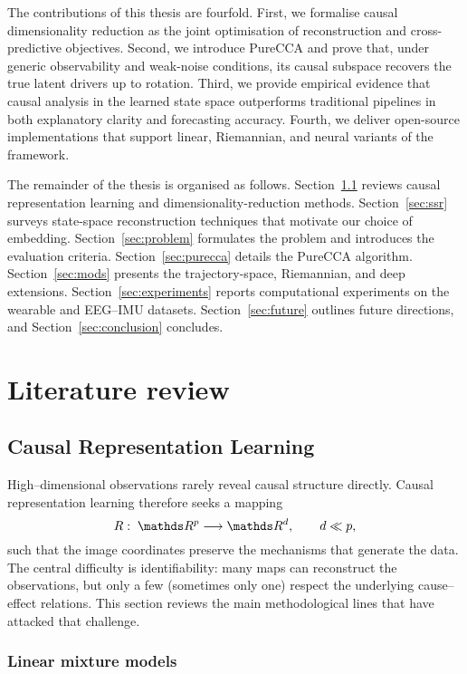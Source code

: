 \documentclass[14pt]{extarticle}
\begin{document}
	The contributions of this thesis are fourfold.  
	First, we formalise causal dimensionality reduction as the joint optimisation of reconstruction and cross-predictive objectives.  
	Second, we introduce PureCCA and prove that, under generic observability and weak-noise conditions, its causal subspace recovers the true latent drivers up to rotation.  
	Third, we provide empirical evidence that causal analysis in the learned state space outperforms traditional pipelines in both explanatory clarity and forecasting accuracy.  
	Fourth, we deliver open-source implementations that support linear, Riemannian, and neural variants of the framework.  
	
	The remainder of the thesis is organised as follows.  
	Section~\ref{sec:causal-dim-red} reviews causal representation learning and dimensionality-reduction methods.  
	Section~\ref{sec:ssr} surveys state-space reconstruction techniques that motivate our choice of embedding.  
	Section~\ref{sec:problem} formulates the problem and introduces the evaluation criteria.  
	Section~\ref{sec:purecca} details the PureCCA algorithm.  
	Section~\ref{sec:mods} presents the trajectory-space, Riemannian, and deep extensions.  
	Section~\ref{sec:experiments} reports computational experiments on the wearable and EEG–IMU datasets.  
	Section~\ref{sec:future} outlines future directions, and Section~\ref{sec:conclusion} concludes.  
	
	\section{Literature review}
	
	\subsection{Causal Representation Learning} \label{sec:causal-dim-red}
	High–dimensional observations rarely reveal causal structure directly.  
	Causal representation learning therefore seeks a mapping
	\[
	R:\;\dR^{p} \longrightarrow \dR^{d},
	\qquad d\ll p,
	\]
	such that the image coordinates preserve the mechanisms that generate the data.  
	The central difficulty is identifiability: many maps can reconstruct the observations, but only a few (sometimes only one) respect the underlying cause–effect relations.  
	This section reviews the main methodological lines that have attacked that challenge.
	
	\subsubsection*{Linear mixture models}
	
\end{document}
